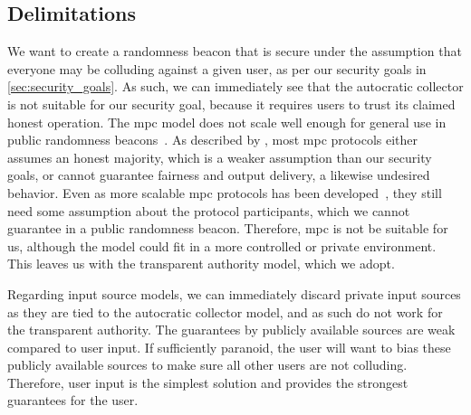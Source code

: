 \subsection{Delimitations}%
\label{sub:delimitations}
We want to create a randomness beacon that is secure under the assumption that everyone may be colluding against a given user, as per our security goals in \cref{sec:security_goals}.
As such, we can immediately see that the autocratic collector is not suitable for our security goal, because it requires users to trust its claimed honest operation.
The \gls{mpc} model does not scale well enough for general use in public randomness beacons~\cite{syta2017scalable}.
As described by \citet{damgaard2006scalable}, most \gls{mpc} protocols either assumes an honest majority, which is a weaker assumption than our security goals, or cannot guarantee fairness and output delivery, a likewise undesired behavior.
Even as more scalable \gls{mpc} protocols has been developed~\cite{damgaard2006scalable}, they still need some assumption about the protocol participants, which we cannot guarantee in a public randomness beacon.
Therefore, \gls{mpc} is not be suitable for us, although the model could fit in a more controlled or private environment.
This leaves us with the transparent authority model, which we adopt.

Regarding input source models, we can immediately discard private input sources as they are tied to the autocratic collector model, and as such do not work for the transparent authority.
The guarantees by publicly available sources are weak compared to user input.
If sufficiently paranoid, the user will want to bias these publicly available sources to make sure all other users are not colluding.
Therefore, user input is the simplest solution and provides the strongest guarantees for the user.


